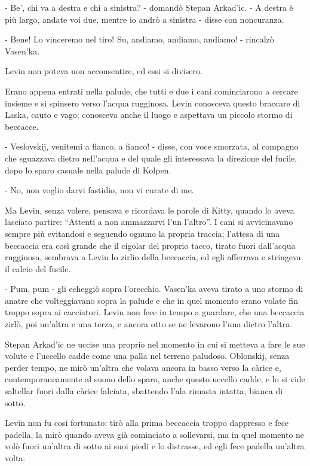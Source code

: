 - Be', chi va a destra e chi a sinistra? - domandò Stepan Arkad'ic. - A destra è più largo, andate voi due, mentre io andrò a sinistra - disse con noncuranza. 

- Bene! Lo vinceremo nel tiro! Su, andiamo, andiamo, andiamo! - rincalzò Vasen'ka. 

Levin non poteva non acconsentire, ed essi si divisero. 

Erano appena entrati nella palude, che tutti e due i cani cominciarono a cercare insieme e si spinsero verso l'acqua rugginosa. Levin conosceva questo braccare di Laska, cauto e vago; conosceva anche il luogo e aspettava un piccolo stormo di beccacce. 

- Veslovskij, venitemi a fianco, a fianco! - disse, con voce smorzata, al compagno che sguazzava dietro nell'acqua e del quale gli interessava la direzione del fucile, dopo lo sparo casuale nella palude di Kolpen. 

- No, non voglio darvi fastidio, non vi curate di me. 

Ma Levin, senza volere, pensava e ricordava le parole di Kitty, quando lo aveva lasciato partire: ``Attenti a non ammazzarvi l'un l'altro''. I cani si avvicinavano sempre più evitandosi e seguendo ognuno la propria traccia; l'attesa di una beccaccia era così grande che il cigolar del proprio tacco, tirato fuori dall'acqua rugginosa, sembrava a Levin lo zirlio della beccaccia, ed egli afferrava e stringeva il calcio del fucile. 

- Pum, pum - gli echeggiò sopra l'orecchio. Vasen'ka aveva tirato a uno stormo di anatre che volteggiavano sopra la palude e che in quel momento erano volate fin troppo sopra ai cacciatori. Levin non fece in tempo a guardare, che una beccaccia zirlò, poi un'altra e una terza, e ancora otto se ne levarono l'una dietro l'altra. 

Stepan Arkad'ic ne uccise una proprio nel momento in cui si metteva a fare le sue volute e l'uccello cadde come una palla nel terreno paludoso. Oblonskij, senza perder tempo, ne mirò un'altra che volava ancora in basso verso la càrice e, contemporaneamente al suono dello sparo, anche questo uccello cadde, e lo si vide saltellar fuori dalla càrice falciata, sbattendo l'ala rimasta intatta, bianca di sotto. 

Levin non fu così fortunato: tirò alla prima beccaccia troppo dappresso e fece padella, la mirò quando aveva già cominciato a sollevarsi, ma in quel momento ne volò fuori un'altra di sotto ai suoi piedi e lo distrasse, ed egli fece padella un'altra volta. 

